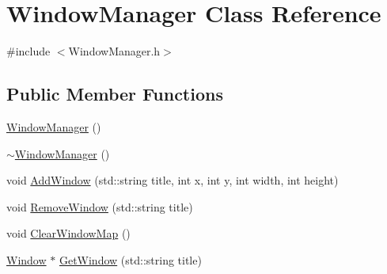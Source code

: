 \hypertarget{class_window_manager}{\section{Window\-Manager Class Reference}
\label{class_window_manager}
}


{\ttfamily \#include $<$Window\-Manager.\-h$>$}

\subsection*{Public Member Functions}
\begin{DoxyCompactItemize}
\item 
\hyperlink{class_window_manager_a3a283b34c19aaa20296befaabad4d29b}{Window\-Manager} ()
\item 
\hyperlink{class_window_manager_a19fd6e41c42760af82460d9851780d82}{$\sim$\-Window\-Manager} ()
\item 
void \hyperlink{class_window_manager_afcdf891c83b309ae396769da2f855682}{Add\-Window} (std\-::string title, int x, int y, int width, int height)
\item 
void \hyperlink{class_window_manager_ad07b9799722dad333040151f0f48c469}{Remove\-Window} (std\-::string title)
\item 
void \hyperlink{class_window_manager_ac03c930e4f89fc3572363a8026f9a48e}{Clear\-Window\-Map} ()
\item 
\hyperlink{class_window}{Window} $\ast$ \hyperlink{class_window_manager_aaa65e4a0aba6ad898f3625356679a65e}{Get\-Window} (std\-::string title)
\end{DoxyCompactItemize}


